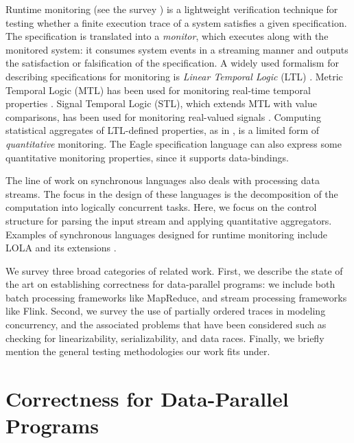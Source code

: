 Runtime monitoring (see the survey \cite{LS2009RV}) is a lightweight verification technique for testing whether a finite execution trace of a system satisfies a given specification. The specification is translated into a \emph{monitor}, which executes along with the monitored system: it consumes system events in a streaming manner and outputs the satisfaction or falsification of the specification. A widely used formalism for describing specifications for monitoring is \emph{Linear Temporal Logic} (LTL) \cite{havelund2004efficient}. Metric Temporal Logic (MTL) has been used for monitoring real-time temporal properties \cite{TR2005MTL}. Signal Temporal Logic (STL), which extends MTL with value comparisons, has been used for monitoring real-valued signals \cite{DDGJJS2017}.
Computing statistical aggregates of LTL-defined properties, as in \cite{finkbeiner2002collecting}, is a limited form of \emph{quantitative} monitoring.
The Eagle specification language \cite{barringer2004rule} can also express some quantitative monitoring properties, since it supports data-bindings.

The line of work on synchronous languages \cite{BCEHlGdS2003SL} also deals with processing data streams. The focus in the design of these languages is the decomposition of the computation into logically concurrent tasks. Here, we focus on the control structure for parsing the input stream and applying quantitative aggregators.
Examples of synchronous languages designed for runtime monitoring include LOLA \cite{d2005lola} and its
extensions \cite{bozzelli2016foundations}.


We survey three broad categories of related work. First, we describe the state of the art on establishing correctness for data-parallel programs: we include both batch processing frameworks like MapReduce, and stream processing frameworks like Flink.
Second, we survey the use of partially ordered traces in modeling concurrency, and the associated problems that have been considered such as checking for linearizability, serializability, and data races.
Finally, we briefly mention the general testing methodologies our work fits under.

\section{Correctness for Data-Parallel Programs}


